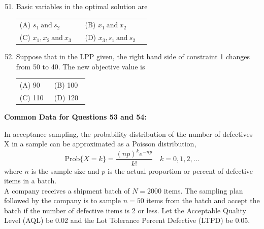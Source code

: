 \documentclass[a4paper,12pt]{article}
\begin{document}
\begin{enumerate}[label=Q.\arabic*, leftmargin=*]
\setcounter{enumi}{50}

\item Basic variables in the optimal solution are
\begin{multicols}{2}
\begin{tabular}[t]{p{0.45\linewidth} p{0.45\linewidth}}
(A) $s_1\ \text{and}\ s_2$ & (B) $x_1\ \text{and}\ x_2$ \\
(C) $x_1, x_2\ \text{and}\ x_3$ & (D) $x_3, s_1\ \text{and}\ s_2$ \\
\end{tabular}
\end{multicols}

\item Suppose that in the LPP given, the right hand side of constraint 1 changes from 50 to 40. The new objective value is
\begin{multicols}{2}
\begin{tabular}[t]{p{0.45\linewidth} p{0.45\linewidth}}
(A) 90 & (B) 100 \\
(C) 110 & (D) 120 \\
\end{tabular}
\end{multicols}
\end{enumerate}

\textbf{Common Data for Questions 53 and 54:}


In acceptance sampling, the probability distribution of the number of defectives X in a sample can be approximated as a Poisson distribution,\\
$$\text{Prob}\{ X = k \} = \frac{(np)^k e^{-np}}{k!} \quad k=0,1,2,...$$
where $n$ is the sample size and $p$ is the actual proportion or percent of defective items in a batch.\\

A company receives a shipment batch of $N = 2000$ items. The sampling plan followed by the company is to sample $n = 50$ items from the batch and accept the batch if the number of defective items is 2 or less. Let the Acceptable Quality Level (AQL) be 0.02 and the Lot Tolerance Percent Defective (LTPD) be 0.05.
\end{document}
